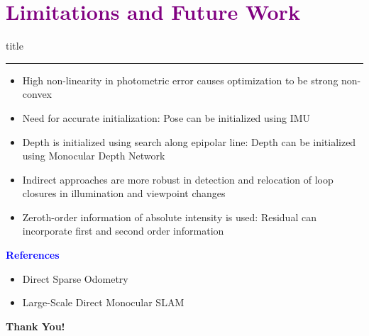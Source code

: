 \documentclass[aspectratio=169]{beamer}
\begin{document}
\section{\textbf{\textcolor{purple}{Limitations and Future Work}}}
		\begin{frame}[plain]
				\vfill
			\centering
			\begin{beamercolorbox}[sep=8pt,center,shadow=true,rounded=true]{title}
				\insertsectionhead\par%
				\color{oxfordblue}\noindent\rule{10cm}{1pt}
			\end{beamercolorbox}
			\vfill

		\begin{itemize}
				\item High non-linearity in photometric error causes optimization to be strong non-convex
				\item Need for accurate initialization: Pose can be initialized using IMU
				\item Depth is initialized using search along epipolar line: Depth can be initialized using Monocular Depth Network
				\item Indirect approaches are more robust in detection and relocation of loop closures in illumination and viewpoint changes
				\item Zeroth-order information of absolute intensity is used: Residual can incorporate first and second order information
		\end{itemize}
	\end{frame}


\begin{frame}{\textcolor{blue}{\textbf{References}}}
	\vspace{-0.5cm}
	\begin{itemize}
			\item Direct Sparse Odometry
			\item Large-Scale Direct Monocular SLAM
	\end{itemize}
\end{frame}

\begin{frame}{}
		\begin{center}


				\vspace{10mm}
				\textbf{\textcolor{teal!80}{\huge  Thank You!}}
		\end{center}
\end{frame}
\end{document}
